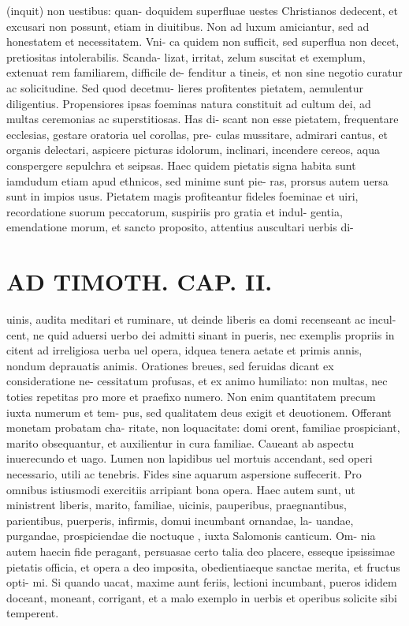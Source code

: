\documentclass{article}
\begin{document}
\begin{pages}
(inquit) non uestibus: quan- doquidem superfluae uestes Christianos dedecent, et excusari non possunt, etiam in diuitibus. Non ad luxum amiciantur, sed ad honestatem et necessitatem. Vni- ca quidem non sufficit, sed superflua non decet, pretiositas intolerabilis. Scanda- lizat, irritat, zelum suscitat et exemplum, extenuat rem familiarem, difficile de- fenditur a tineis, et non sine negotio curatur ac solicitudine. Sed quod decetmu- lieres profitentes pietatem, aemulentur diligentius. Propensiores ipsas foeminas natura constituit ad cultum dei, ad multas ceremonias ac superstitiosas. Has di- scant non esse pietatem, frequentare ecclesias, gestare oratoria uel corollas, pre- culas mussitare, admirari cantus, et organis delectari, aspicere picturas idolorum, inclinari, incendere cereos, aqua conspergere sepulchra et seipsas. Haec quidem pietatis signa habita sunt iamdudum etiam apud ethnicos, sed minime sunt pie- ras, prorsus autem uersa sunt in impios usus. Pietatem magis profiteantur fideles foeminae et uiri, recordatione suorum peccatorum, suspiriis pro gratia et indul- gentia, emendatione morum, et sancto proposito, attentius auscultari uerbis di-  \pend
\section*{AD TIMOTH. CAP. II. }
\marginpar{[ p.487 ]}\pstart uinis, audita meditari et ruminare, ut deinde liberis ea domi recenseant ac incul- cent, ne quid aduersi uerbo dei admitti sinant in pueris, nec exemplis propriis in citent ad irreligiosa uerba uel opera, idquea tenera aetate et primis annis, nondum deprauatis animis. Orationes breues, sed feruidas dicant ex consideratione ne- cessitatum profusas, et ex animo humiliato: non multas, nec toties repetitas pro more et praefixo numero. Non enim quantitatem precum iuxta numerum et tem- pus, sed qualitatem deus exigit et deuotionem. Offerant monetam probatam cha- ritate, non loquacitate: domi orent, familiae prospiciant, marito obsequantur, et auxilientur in cura familiae. Caueant ab aspectu inuerecundo et uago. Lumen non lapidibus uel mortuis accendant, sed operi necessario, utili ac tenebris. Fides sine aquarum aspersione suffecerit. Pro omnibus istiusmodi exercitiis arripiant bona opera. Haec autem sunt, ut ministrent liberis, marito, familiae, uicinis, pauperibus, praegnantibus, parientibus, puerperis, infirmis, domui incumbant ornandae, la- uandae, purgandae, prospiciendae die noctuque , iuxta Salomonis canticum. Om- nia autem haecin fide peragant, persuasae certo talia deo placere, esseque  ipsissimae pietatis officia, et opera a deo imposita, obedientiaeque  sanctae merita, et fructus opti- mi. Si quando uacat, maxime aunt feriis, lectioni incumbant, pueros ididem doceant, moneant, corrigant, et a malo exemplo in uerbis et operibus solicite sibi temperent.  \pend
{}
{}

\end{pages}
\end{document}
